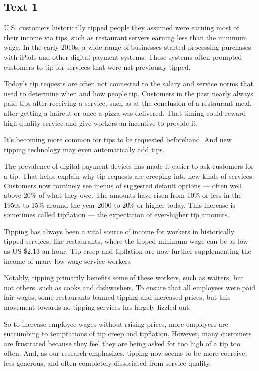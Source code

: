 \documentclass[UTF8,11pt]{ctexart}
\begin{document}
\subsection*{\textbf{Text 1}}


U.S. customers historically tipped people they assumed were earning most of their income via tips, such as restaurant servers earning less than the minimum wage. In the early 2010s, a wide range of businesses started processing purchases with iPads and other digital payment systems. These systems often prompted customers to tip for services that were not previously tipped.


Today’s tip requests are often not connected to the salary and service norms that used to determine when and how people tip. Customers in the past nearly always paid tips after receiving a service, such as at the conclusion of a restaurant meal, after getting a haircut or once a pizza was delivered. That timing could reward high-quality service and give workers an incentive to provide it.


It’s becoming more common for tips to be requested beforehand. And new tipping technology may even automatically add tips.


The prevalence of digital payment devices has made it easier to ask customers for a tip. That helps explain why tip requests are creeping into new kinds of services. Customers now routinely see menus of suggested default options — often well above 20\% of what they owe. The amounts have risen from 10\% or less in the 1950s to 15\% around the year 2000 to 20\% or higher today. This increase is sometimes called tipflation — the expectation of ever-higher tip amounts.


Tipping has always been a vital source of income for workers in historically tipped services, like restaurants, where the tipped minimum wage can be as low as US \$2.13 an hour. Tip creep and tipflation are now further supplementing the income of many low-wage service workers.


Notably, tipping primarily benefits some of these workers, such as waiters, but not others, such as cooks and dishwashers. To ensure that all employees were paid fair wages, some restaurants banned tipping and increased prices, but this movement towards no-tipping services has largely fizzled out.


So to increase employee wages without raising prices, more employers are succumbing to temptations of tip creep and tipflation. However, many customers are frustrated because they feel they are being asked for too high of a tip too often. And, as our research emphasizes, tipping now seems to be more coercive, less generous, and often completely dissociated from service quality.
\end{document}

